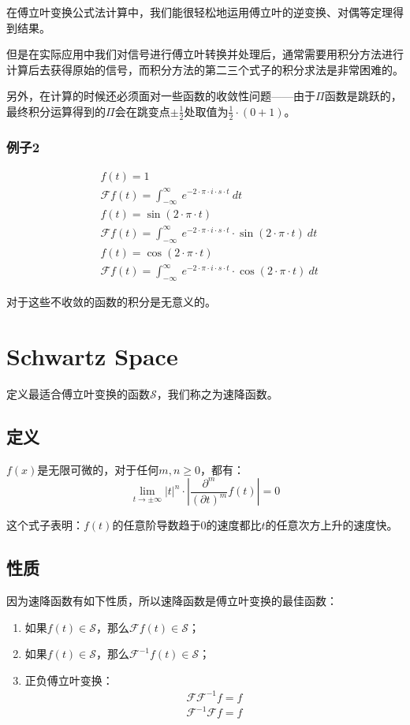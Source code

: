 在傅立叶变换公式法计算中，我们能很轻松地运用傅立叶的逆变换、对偶等定理得到结果。

但是在实际应用中我们对信号进行傅立叶转换并处理后，通常需要用积分方法进行计算后去获得原始的信号，而积分方法的第二三个式子的积分求法是非常困难的。

另外，在计算的时候还必须面对一些函数的收敛性问题——由于$\Pi$函数是跳跃的，最终积分运算得到的$\Pi$会在跳变点$\pm \frac{1}{2}$处取值为$\frac{1}{2}\cdot (0+1)$。
\subsubsection{例子2}
\begin{align*}
	 & f(t)  =1                                                                                                       \\
	 & \mathcal{F}f(t)=\int_{-\infty}^{\infty}\ e^{-2\cdot \pi\cdot i\cdot s\cdot t}\ dt                              \\
	 & f(t) =\sin(2\cdot\pi\cdot t)                                                                                   \\
	 & \mathcal{F}f(t)  =\int_{-\infty}^{\infty}\ e^{-2\cdot \pi\cdot i\cdot s\cdot t}\cdot\sin(2\cdot\pi\cdot t)\ dt \\
	 & f(t)=\cos(2\cdot\pi\cdot t)                                                                                    \\
	 & \mathcal{F}f(t)=\int_{-\infty}^{\infty}\ e^{-2\cdot \pi\cdot i\cdot s\cdot t}\cdot \cos(2\cdot\pi\cdot t)\ dt
\end{align*}

对于这些不收敛的函数的积分是无意义的。
\section{Schwartz Space}
定义最适合傅立叶变换的函数$\mathcal  {S}$，我们称之为速降函数。
\subsection{定义}
$f(x)$是无限可微的，对于任何$m,n\geq 0$，都有：
$$
	\lim\limits_{t\rightarrow\pm\infty}|t|^n\cdot |\frac{\partial^m}{(\partial t)^m}f(t)|=0
$$

这个式子表明：$f(t)$的任意阶导数趋于$0$的速度都比$t$的任意次方上升的速度快。
\subsection{性质}
因为速降函数有如下性质，所以速降函数是傅立叶变换的最佳函数：
\begin{enumerate}
	\item 如果$f(t)\in \mathcal  {S}$，那么$\mathcal{F}f(t)\in \mathcal  {S}$；
	\item 如果$f(t)\in \mathcal  {S}$，那么$\mathcal{F}^{-1}f(t)\in \mathcal  {S}$；
	\item 正负傅立叶变换：
	      \begin{align*}
		      \mathcal{F}\mathcal{F}^{-1}f=f \\
		      \mathcal{F}^{-1}\mathcal{F}f=f
	      \end{align*}
\end{enumerate}

